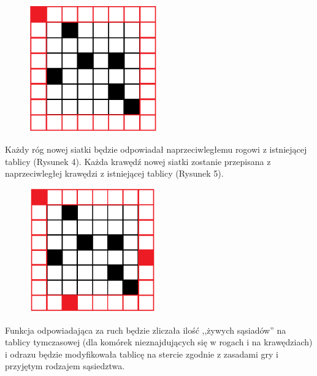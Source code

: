 \documentclass{article}
\begin{document}
\begin{figure} [hbt!]
    \centering
    \includegraphics[width=5.5cm]{third.png}
    
\end{figure}

Każdy róg nowej siatki będzie odpowiadał naprzeciwległemu rogowi z istniejącej tablicy (Rysunek 4).
\newpage
Każda krawędź nowej siatki zostanie przepisana z naprzeciwległej krawędzi z istniejącej tablicy (Rysunek 5).
\begin{figure} [hbt!]
    \centering
    \includegraphics[width=5.5cm]{fourth.png}
\end{figure}
Funkcja odpowiadająca za ruch będzie zliczała ilość ,,żywych sąsiadów'' na tablicy tymczasowej (dla komórek nieznajdujących się w rogach i na krawędziach) i odrazu będzie modyfikowała tablicę na stercie zgodnie z zasadami gry i przyjętym rodzajem sąsiedztwa. 
\end{document}

